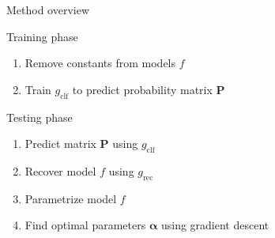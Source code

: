 \documentclass{beamer}
\begin{document}
\begin{frame}{Method overview}
\begin{block}{Training phase}
	\begin{enumerate}
		\item Remove constants from models $f$
		\item Train $g_\text{clf}$ to predict probability matrix $\mathbf{P}$
	\end{enumerate}
\end{block}

\begin{block}{Testing phase}
	\begin{enumerate}
		\item Predict matrix $\mathbf{P}$ using $g_\text{clf}$
		\item Recover model $f$ using $g_\text{rec}$
		\item Parametrize model $f$
		\item Find optimal parameters $\bm{\alpha}$ using gradient descent
	\end{enumerate}
\end{block}
\end{frame}
\end{document}
